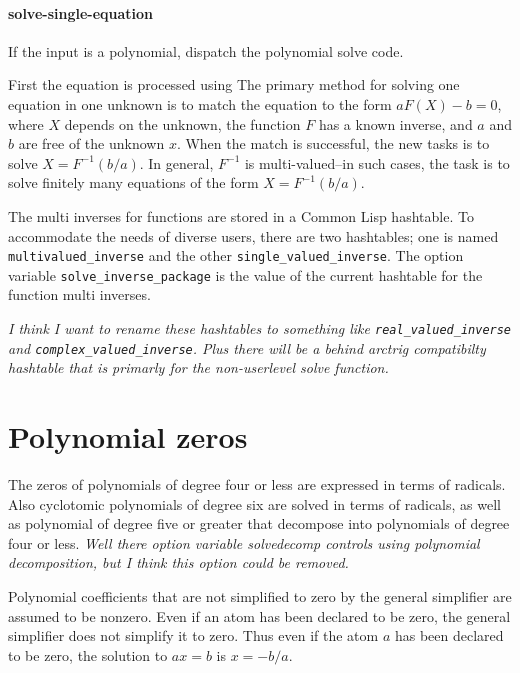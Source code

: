 \documentclass[]{scrartcl}
\newcommand{\multivaluedinverse}{\texttt{multivalued\_inverse}}
\newcommand{\singlevaluedinverse}{\texttt{single\_valued\_inverse}}
\newcommand{\solveinversepackage}{\texttt{solve\_inverse\_package}}
\begin{document}
\paragraph{solve-single-equation} If the input is a polynomial, dispatch the polynomial solve code.

First the equation is processed using
The primary method for solving one equation in one unknown is to match the equation to the form \(a F(X) - b = 0\), where \(X\) depends on the unknown, the function \(F\) has a known inverse, and \(a\) and \(b\) are free of the unknown \(x\). When the match is successful, the new tasks is to solve \(X = F^{-1}(b/a) \). In general, \(F^{-1}\) is multi-valued--in such cases, the task is to solve finitely many equations of the form  \(X = F^{-1}(b/a) \).

The multi inverses for functions are stored in a Common Lisp hashtable. To accommodate the needs of diverse users,
there are two hashtables; one is named \multivaluedinverse\/ and the other \singlevaluedinverse.  The option
variable \solveinversepackage\/ is the value of the current hashtable for the function multi inverses.

\emph{I think I want to rename these hashtables to something like \texttt{real\_valued\_inverse}
and \texttt{complex\_valued\_inverse}. Plus there will be a behind arctrig compatibilty hashtable that is primarly for the non-userlevel solve function.}

\section{Polynomial zeros}

The zeros of polynomials of degree four or less are expressed in terms of radicals. Also  cyclotomic
polynomials of degree six are solved in terms of radicals, as well as polynomial of degree five or
greater that decompose into polynomials of degree four or less. \emph{Well there option variable solvedecomp controls using polynomial decomposition, but I think this option could be removed.}

\begin{alphalist}[]

\item  Polynomial coefficients that are not simplified to zero by the  general simplifier are
assumed to be nonzero. Even if an atom has been declared to be zero, the general simplifier does
not simplify  it to zero. Thus even if the atom \(a\) has been declared to be zero,
the solution to \(a x = b\) is \(x = -b/a \).



\end{alphalist}
\end{document}
